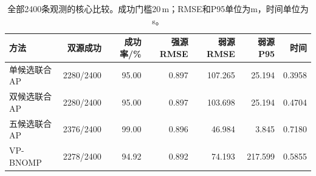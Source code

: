 \begin{table}[pos=H]\centering\small
\caption{全部2400条观测的核心比较。成功门槛20\,m；RMSE和P95单位为m，时间单位为s。}\label{tab:formalcore}
\begin{tabular}{@{}lrrrrrr@{}}\toprule
方法 & 双源成功 & 成功率/\% & 强源RMSE & 弱源RMSE & 弱源P95 & 时间\\\midrule
单候选联合AP & 2280/2400 & 95.00 & 0.897 & 107.265 & 25.194 & 0.3958\\
双候选联合AP & 2280/2400 & 95.00 & 0.897 & 103.698 & 25.194 & 0.4704\\
五候选联合AP & 2376/2400 & 99.00 & 0.896 & 46.984 & 3.845 & 0.7180\\
VP-BNOMP & 2278/2400 & 94.92 & 0.892 & 74.193 & 217.599 & 0.5855\\
\bottomrule\end{tabular}\end{table}
